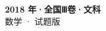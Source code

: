\documentclass[zihao=-4, a4paper]{ctexart}
\begin{document}
\begin{center}
  {\Large\bfseries 2018 年·全国Ⅲ卷·文科}\\[4pt]
  {\large 数学 · 试题版}
\end{center}
\medskip
{}

\end{document}

